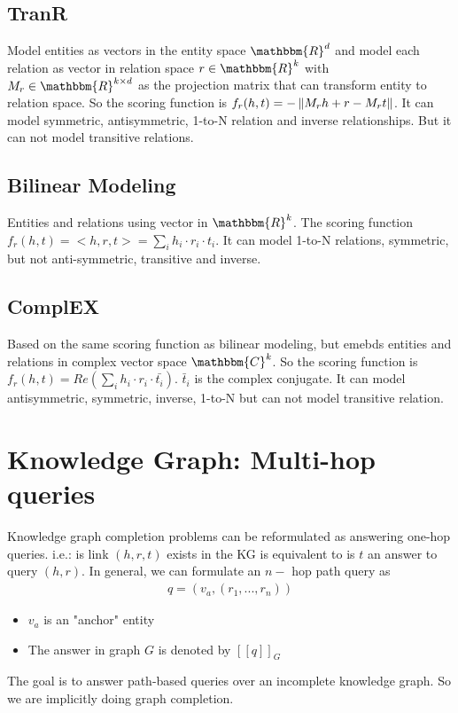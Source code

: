 \subsection{TranR} 
Model entities as vectors in the entity space $\mathbbm{R}^d$ and model each relation as vector in relation space $r\in \mathbbm{R}^k$ with $M_r \in \mathbbm{R}^{k \times d}$ as the projection matrix that can transform entity to relation space.  So the scoring function is $f_r(h,t) = - \left\lVert M_rh + r - M_rt\right\rVert$. It can model symmetric, antisymmetric, 1-to-N relation and inverse relationships. But it can not model transitive relations. 

\subsection{Bilinear Modeling} 
Entities and relations using vector in $\mathbbm{R}^k$. The scoring function $f_r(h,t) = <h, r, t> = \sum_i h_i \cdot r_i \cdot t_i$. It can model 1-to-N relations, symmetric, but not anti-symmetric, transitive and inverse. 

\subsection{ComplEX} 
Based on the same scoring function as bilinear modeling, but emebds entities and relations in complex vector space $\mathbbm{C}^k$. So the scoring function is $f_r(h,t) = Re(\sum_i h_i \cdot r_i \cdot \bar{t_i})$. $\bar{t}_i$ is the complex conjugate. It can model antisymmetric, symmetric, inverse, 1-to-N but can not model transitive relation. 


\section{Knowledge Graph: Multi-hop queries}
Knowledge graph completion problems can be reformulated as answering one-hop queries. i.e.: is link $(h, r, t)$ exists in the KG is equivalent to is $t$ an answer to query $(h,r)$. In general, we can formulate an $n-$ hop path query as 
    \begin{align*}
        q = (v_a, (r_1, ..., r_ n))
    \end{align*}
    \begin{itemize}
        \item $v_a$ is an "anchor" entity
        \item The answer in graph $G$ is denoted by $[[q]]_G$
    \end{itemize}
The goal is to answer path-based queries over an incomplete knowledge graph. So we are implicitly doing graph completion. 

